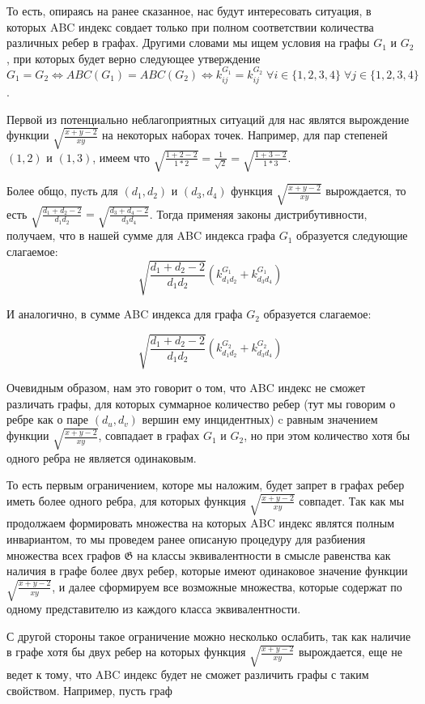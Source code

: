 \documentclass{article}
\begin{document}
То есть, опираясь на ранее сказанное, нас будут интересовать ситуация, в которых ABC индекс совдает только при полном соответствии количества различных ребер в графах. Другими словами мы ищем условия на графы $G_1$ и $G_2$, при которых будет верно следующее утверждение 
$ G_1 = G_2  \iff ABC(G_1) = ABC(G_2) \iff k_{ij}^{G_1} = k_{ij}^{G_2} \; \forall i \in \{ 1, 2, 3, 4 \} \; \forall j \in \{ 1, 2, 3, 4 \} $. 

Первой из потенциально неблагоприятных ситуаций для нас являтся вырождение функции $\sqrt{\frac{x + y - 2}{xy}}$ на некоторых наборах точек. Например, для пар степеней $(1, 2)$ и $(1, 3)$, имеем что $\sqrt{\frac{1 + 2 - 2}{1 * 2}} = \frac{1}{\sqrt{2}} = \sqrt{\frac{1 + 3 - 2}{1 * 3}}$. 

Более общо, пуcть для $(d_1, d_2)$ и $(d_3, d_4)$ функция $\sqrt{\frac{x + y - 2}{xy}}$ вырождается, то есть $\sqrt{\frac{d_1 + d_2 - 2}{d_1 d_2}} =
\sqrt{\frac{d_3 + d_4 - 2}{d_3 d_4}}$. Тогда применяя законы дистрибутивности, получаем, что в нашей сумме для ABC индекса графа $G_1$ образуется следующие слагаемое:
$$ \sqrt{\frac{d_1 + d_2 - 2}{d_1 d_2}} (k_{d_1 d_2}^{G_1} + k_{d_3 d_4}^{G_1})$$

И аналогично, в сумме ABC индекса для графа $G_2$ образуется слагаемое:

$$ \sqrt{\frac{d_1 + d_2 - 2}{d_1 d_2}} (k_{d_1 d_2}^{G_2} + k_{d_3 d_4}^{G_2}) $$


Очевидным образом, нам это говорит о том, что ABC индекс не сможет различать графы, для которых суммарное количество ребер (тут мы говорим о ребре как о паре $(d_u, d_v)$ вершин ему инцидентных) c равным значением функции $\sqrt{\frac{x + y - 2}{x y}}$, совпадает в графах $G_1$ и $G_2$, но при этом количество хотя бы одного ребра не является одинаковым.

То есть первым ограничением, которе мы наложим, будет запрет в графах ребер иметь более одного ребра, для которых функция $\sqrt{\frac{x + y - 2}{x y}}$ совпадет. Так как мы продолжаем формировать множества на которых ABC индекс являтся полным инвариантом, то мы проведем ранее описаную процедуру для разбиения множества всех графов $\mathfrak{G}$ на классы эквивалентности в смысле равенства как наличия в графе более двух ребер, которые имеют одинаковое значение функции $\sqrt{\frac{x + y - 2}{x y}}$, и далее сформируем все возможные множества, которые содержат по одному представителю из каждого класса эквивалентности.

С другой стороны такое ограничение можно несколько ослабить, так как наличие в графе хотя бы двух ребер на которых функция $\sqrt{\frac{x + y - 2}{x y}}$ вырождается, еще не ведет к тому, что ABC индекс будет не сможет различить графы с таким свойством. Например, пусть граф 
\end{document}
